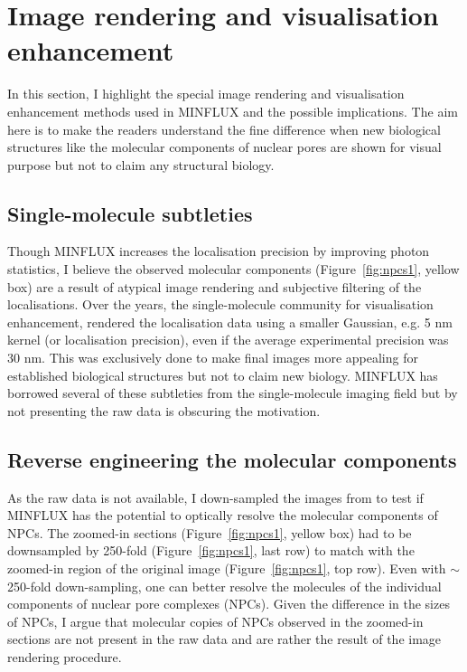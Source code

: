 \documentclass[9pt,twocolumn,twoside]{pnas-new}
\begin{document}
\section{Image rendering and visualisation enhancement}

In this section, I highlight the special image rendering and visualisation enhancement methods used in MINFLUX and the possible implications. The aim here is to make the readers understand the fine difference when new biological structures like the molecular components of nuclear pores are shown for visual purpose but not to claim any structural biology. 



\subsection{Single-molecule subtleties}
Though MINFLUX increases the localisation precision by improving photon statistics, I believe the observed molecular components (Figure~\ref{fig:npcs1}, yellow box) are a result of atypical image rendering and subjective filtering of the localisations. Over the years, the single-molecule community for visualisation enhancement, rendered the localisation data using a smaller Gaussian, e.g. 5 nm kernel (or localisation precision), even if the average experimental precision was 30 nm. This was exclusively done to make final images more appealing for established biological structures but not to claim new biology. MINFLUX has borrowed several of these subtleties from the single-molecule imaging field but by not presenting the raw data is obscuring the motivation. 

\subsection{Reverse engineering the molecular components}
As the raw data is not available, I down-sampled the images from \cite{gwosch2020minflux} to test if MINFLUX has the potential to optically resolve the molecular components of NPCs. The zoomed-in sections (Figure~\ref{fig:npcs1}, yellow box) had to be downsampled by 250-fold (Figure~\ref{fig:npcs1}, last row) to match with the zoomed-in region of the original image (Figure~\ref{fig:npcs1}, top row). Even with $\sim$250-fold down-sampling, one can better resolve the molecules of the individual components of nuclear pore complexes (NPCs). Given the difference in the sizes of NPCs, I argue that molecular copies of NPCs observed in the zoomed-in sections are not present in the raw data and are rather the result of the image rendering procedure. 
\end{document}
